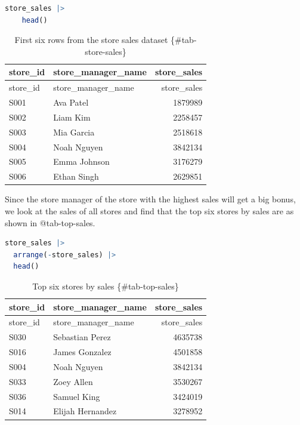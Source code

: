 \documentclass[
  12pt,
  letterpaper,
  DIV=11,
  numbers=noendperiod]{scrreprt}
\begin{document}
\begin{lstlisting}[language=R]
store_sales |>
    head()
\end{lstlisting}

\begin{longtable}[]{@{}llr@{}}
\caption{First six rows from the store sales dataset
\{\#tab-store-sales\}}\tabularnewline
\toprule\noalign{}
store\_id & store\_manager\_name & store\_sales \\
\midrule\noalign{}
\endfirsthead
\toprule\noalign{}
store\_id & store\_manager\_name & store\_sales \\
\midrule\noalign{}
\endhead
\bottomrule\noalign{}
\endlastfoot
S001 & Ava Patel & 1879989 \\
S002 & Liam Kim & 2258457 \\
S003 & Mia Garcia & 2518618 \\
S004 & Noah Nguyen & 3842134 \\
S005 & Emma Johnson & 3176279 \\
S006 & Ethan Singh & 2629851 \\
\end{longtable}

Since the store manager of the store with the highest sales will get a
big bonus, we look at the sales of all stores and find that the top six
stores by sales are as shown in @tab-top-sales.

\begin{lstlisting}[language=R]
store_sales |> 
  arrange(-store_sales) |> 
  head() 
\end{lstlisting}

\begin{longtable}[]{@{}llr@{}}
\caption{Top six stores by sales \{\#tab-top-sales\}}\tabularnewline
\toprule\noalign{}
store\_id & store\_manager\_name & store\_sales \\
\midrule\noalign{}
\endfirsthead
\toprule\noalign{}
store\_id & store\_manager\_name & store\_sales \\
\midrule\noalign{}
\endhead
\bottomrule\noalign{}
\endlastfoot
S030 & Sebastian Perez & 4635738 \\
S016 & James Gonzalez & 4501858 \\
S004 & Noah Nguyen & 3842134 \\
S033 & Zoey Allen & 3530267 \\
S036 & Samuel King & 3424019 \\
S014 & Elijah Hernandez & 3278952 \\
\end{longtable}
\end{document}

